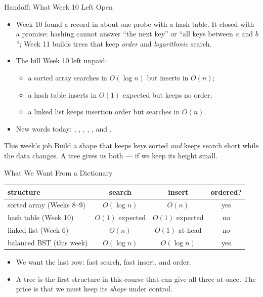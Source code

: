 \documentclass[aspectratio=169]{beamer}
\begin{document}
\begin{frame}{Handoff: What Week 10 Left Open}
  \begin{itemize}
    \item Week 10 found a record in about one probe with a hash table.
      It closed with a promise: hashing cannot answer ``the next key'' or
      ``all keys between $a$ and $b$''; Week 11 builds trees that keep
      \emph{order} and \emph{logarithmic} search.
    \item The bill Week 10 left unpaid:
      \begin{itemize}
        \item a sorted array searches in $O(\log n)$ but inserts in $O(n)$;
        \item a hash table inserts in $O(1)$ expected but keeps no order;
        \item a linked list keeps insertion order but searches in $O(n)$.
      \end{itemize}
    \item New words today: , , ,
      , , and
      .
  \end{itemize}
  \begin{exampleblock}{This week's job}
    Build a shape that keeps keys sorted \emph{and} keeps search short while
    the data changes. A tree gives us both --- if we keep its height small.
  \end{exampleblock}
\end{frame}

\begin{frame}{What We Want From a Dictionary}
  \begin{center}
  {\footnotesize
  \begin{tabular}{l c c c}
    \toprule
    \textbf{structure} & \textbf{search} & \textbf{insert} & \textbf{ordered?} \\
    \midrule
    sorted array (Weeks 8--9) & $O(\log n)$ & $O(n)$ & yes \\
    hash table (Week 10)      & $O(1)$ expected & $O(1)$ expected & no \\
    linked list (Week 6)      & $O(n)$ & $O(1)$ at head & no \\
    \midrule
    balanced BST (this week)  & $O(\log n)$ & $O(\log n)$ & yes \\
    \bottomrule
  \end{tabular}}
  \end{center}
  \begin{itemize}
    \item We want the last row: fast search, fast insert, and order.
    \item A tree is the first structure in this course that can give all
      three at once. The price is that we must keep its \emph{shape} under
      control.
  \end{itemize}
\end{frame}
\end{document}
